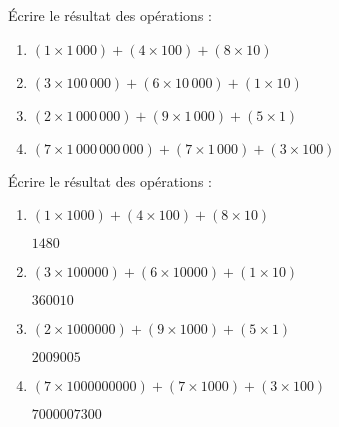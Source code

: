\begin{exercice}
    Écrire le résultat des opérations :
     \begin{enumerate}
        \item $(1\times1\,000) + (4\times100) + (8\times10)$
        \item $(3\times100\,000) + (6\times10\,000) + (1\times10)$
        \item $(2\times1\,000\,000) + (9\times1\,000) + (5\times1)$
        \item $(7\times1\,000\,000\,000) + (7\times1\,000) + (3\times100)$
     \end{enumerate}
  \end{exercice}

  \begin{corrige}
    Écrire le résultat des opérations :
     \begin{enumerate}
        \item $(1\times\num{1000}) + (4\times100) + (8\times10)$
        
        {\red $\num{1480}$}
        \item $(3\times\num{100000}) + (6\times\num{10000}) + (1\times10)$
        
        {\red $\num{360010}$}
        \item $(2\times\num{1000000}) + (9\times\num{1000}) + (5\times1)$
        
        {\red $\num{2009005}$}
        \item $(7\times\num{1000000000}) + (7\times\num{1000}) + (3\times100)$
        
        {\red $\num{7 000 007 300}$}
     \end{enumerate}
  \end{corrige}